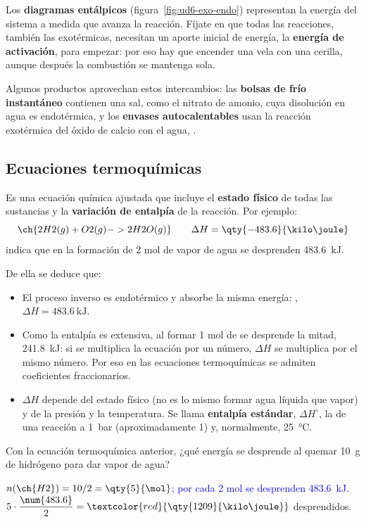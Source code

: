 Los \textbf{diagramas entálpicos} (figura~\ref{fig:ud6-exo-endo}) representan la energía del sistema a medida que avanza la
reacción. Fíjate en que todas las reacciones, también las exotérmicas, necesitan un aporte inicial de energía, la \textbf{energía
de activación}, para empezar: por eso hay que encender una vela con una cerilla, aunque después la combustión se mantenga sola.

Algunos productos aprovechan estos intercambios: las \textbf{bolsas de frío instantáneo} contienen una sal, como el nitrato de
amonio, cuya disolución en agua es endotérmica, y los \textbf{envases autocalentables} usan la reacción exotérmica del óxido de
calcio con el agua, .

\subsection{Ecuaciones termoquímicas}

\begin{definition}
    Es una ecuación química ajustada que incluye el \textbf{estado físico} de todas las sustancias y la \textbf{variación de
    entalpía} de la reacción. Por ejemplo:
    \[ \ch{2 H2(g) + O2(g) -> 2 H2O(g)} \qquad \Delta H = \qty{-483.6}{\kilo\joule} \]
    indica que en la formación de 2 mol de vapor de agua se desprenden \qty{483.6}{\kilo\joule}.
\end{definition}

De ella se deduce que:
\begin{itemize}
    \item El proceso inverso es endotérmico y absorbe la misma energía: ,
    \(\Delta H = \qty{+483.6}{\kilo\joule}\).
    \item Como la entalpía es extensiva, al formar 1 mol de  se desprende la mitad, \qty{241.8}{\kilo\joule}: si se
    multiplica la ecuación por un número, \(\Delta H\) se multiplica por el mismo número. Por eso en las ecuaciones termoquímicas
    se admiten coeficientes fraccionarios.
    \item \(\Delta H\) depende del estado físico (no es lo mismo formar agua líquida que vapor) y de la presión y la temperatura. Se
    llama \textbf{entalpía estándar}, \(\Delta H^\circ\), la de una reacción a \qty{1}{\bar} (aproximadamente \qty{1}{\atm}) y,
    normalmente, \qty{25}{\degreeCelsius}.
\end{itemize}

\begin{exercise}
    Con la ecuación termoquímica anterior, ¿qué energía se desprende al quemar \qty{10}{\gram} de hidrógeno para dar vapor de agua?
    \begin{solu}
        \textcolor{blue}{\(n(\ch{H2}) = 10/2 = \qty{5}{\mol}\); por cada 2 mol se desprenden \qty{483.6}{\kilo\joule}.}
        \(5 \cdot \dfrac{\num{483.6}}{2} = \textcolor{red}{\qty{1209}{\kilo\joule}}\) desprendidos.
    \end{solu}
\end{exercise}

